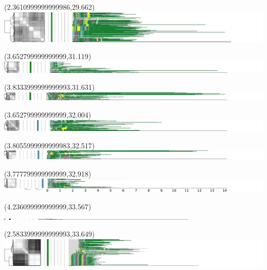 \documentclass{article}
\begin{document}
\begin{textblock}{13}(2.3610999999999986,29.662)\includegraphics{haplotypes-constrained/chr21-HG002.pdf}\end{textblock}
\begin{textblock}{13}(3.652799999999999,31.119)\includegraphics{haplotypes-constrained/chr21-HG003.pdf}\end{textblock}
\begin{textblock}{13}(3.8333999999999993,31.631)\includegraphics{haplotypes-constrained/chr21-HG004.pdf}\end{textblock}
\begin{textblock}{13}(3.652799999999999,32.004)\includegraphics{haplotypes-constrained/chr21-HG005.pdf}\end{textblock}
\begin{textblock}{13}(3.8055999999999983,32.517)\includegraphics{haplotypes-constrained/chr21-HG006.pdf}\end{textblock}
\begin{textblock}{13}(3.777799999999999,32.918)\includegraphics{haplotypes-constrained/chr21-HG007.pdf}\end{textblock}
\begin{textblock}{13}(4.236099999999999,33.567)\includegraphics{haplotypes-constrained/chr22-HG001.pdf}\end{textblock}
\begin{textblock}{13}(2.5833999999999993,33.649)\includegraphics{haplotypes-constrained/chr22-HG002.pdf}\end{textblock}
\end{document}
